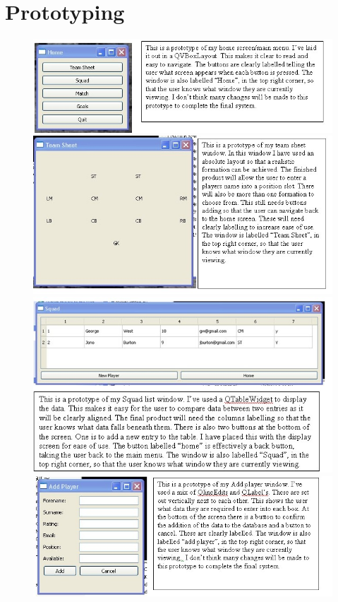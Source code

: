 \section{Prototyping}
\begin{figure}[H]
	\includegraphics[width=150mm]{HomePT}
	\includegraphics[width=150mm]{TeamSheetPT}
	\includegraphics[width=150mm]{SquadPT}
	\includegraphics[width=150mm]{AddPlayerPT}

\end{figure}
